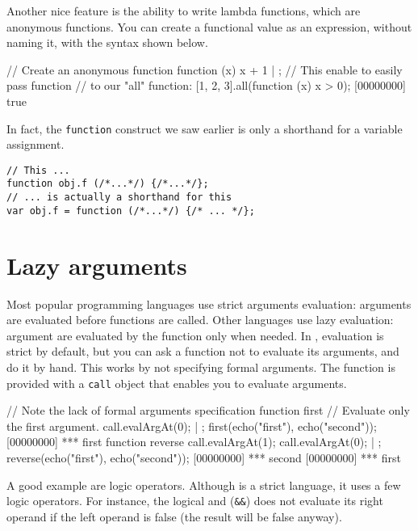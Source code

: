 Another nice feature is the ability to write lambda functions, which
are anonymous functions. You can create a functional value as an
expression, without naming it, with the syntax shown below.

\begin{urbiscript}
// Create an anonymous function
function (x) {x + 1} | {};
// This enable to easily pass function
// to our "all" function:
[1, 2, 3].all(function (x) { x > 0});
[00000000] true
\end{urbiscript}

In fact, the \lstinline{function} construct we saw earlier is only a
shorthand for a variable assignment.

\begin{lstlisting}
// This ...
function obj.f (/*...*/) {/*...*/};
// ... is actually a shorthand for this
var obj.f = function (/*...*/) {/* ... */};
\end{lstlisting}

\section{Lazy arguments}

Most popular programming languages use strict arguments evaluation:
arguments are evaluated before functions are called. Other languages
use lazy evaluation: argument are evaluated by the function only when
needed. In \us, evaluation is strict by default, but you can ask a
function not to evaluate its arguments, and do it by hand. This works
by not specifying formal arguments. The function is provided with a
\lstinline{call} object that enables you to evaluate arguments.

\begin{urbiscript}
// Note the lack of formal arguments specification
function first
{
  // Evaluate only the first argument.
  call.evalArgAt(0);
} | {};
first(echo("first"), echo("second"));
[00000000] *** first
function reverse
{
  call.evalArgAt(1);
  call.evalArgAt(0);
} | {};
reverse(echo("first"), echo("second"));
[00000000] *** second
[00000000] *** first
\end{urbiscript}

A good example are logic operators. Although \Cxx is a strict
language, it uses a few logic operators. For instance, the logical and
(\lstinline{&&}) does not evaluate its right operand if the left
operand is false (the result will be false anyway).

